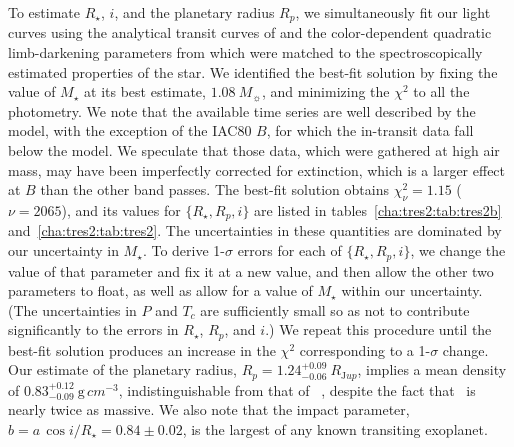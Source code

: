 To estimate $R_{\star}$, $i$, and the planetary radius $R_{p}$, we
simultaneously fit our light curves using the analytical transit
curves of \citet{Mandel_Agol:apjl:2002a} and the color-dependent
quadratic limb-darkening parameters from \citet{Claret:aa:2000a} which
were matched to the spectroscopically estimated properties of the
star.  We identified the best-fit solution by fixing the value of
$M_{\star}$ at its best estimate, $1.08\ M_{\sun}$, and minimizing the
${\chi}^2$ to all the photometry.  We note that the available time
series are well described by the model, with the exception of the
IAC80 $B$, for which the in-transit data fall below the model.  We
speculate that those data, which were gathered at high air mass, may
have been imperfectly corrected for extinction, which is a larger
effect at $B$ than the other band passes.  The best-fit solution
obtains ${\chi}_{\nu}^2=1.15$ ($\nu=2065$), and
its values for $\{R_{\star}, R_{p},i\}$ are listed in tables~\ref{cha:tres2:tab:tres2b}
and~\ref{cha:tres2:tab:tres2}. The
uncertainties in these quantities are dominated by our uncertainty in
$M_{\star}$. To derive 1-$\sigma$ errors for each of $\{R_{\star},
R_{p}, i\}$, we change the value of that parameter and fix it at a new
value, and then allow the other two parameters to float, as well as
allow for a value of $M_{\star}$ within our uncertainty. (The uncertainties in
$P$ and $T_{c}$ are sufficiently small so as not to contribute significantly
to the errors in $R_{\star}$, $R_{p}$, and $i$.) We repeat
this procedure until the best-fit solution produces an increase in the
${\chi}^2$ corresponding to a 1-$\sigma$ change.  Our estimate of the
planetary radius, $R_{p} = 1.24^{+0.09}_{-0.06}\ R_{\mathrm Jup}$, implies
a mean density of $0.83^{+0.12}_{-0.09} \ {\mathrm g\, cm^{-3}}$,
indistinguishable from that of \tresOne\ \citep[using the values
  from][]{Sozzetti_Yong_Torres:apjl:2004a}, despite the fact that
\tresTwo\ is nearly twice as massive. We also note that the impact
parameter, $b = a\, \cos{i} / R_{\star} = 0.84\pm0.02$, is the largest of any
known transiting exoplanet.

